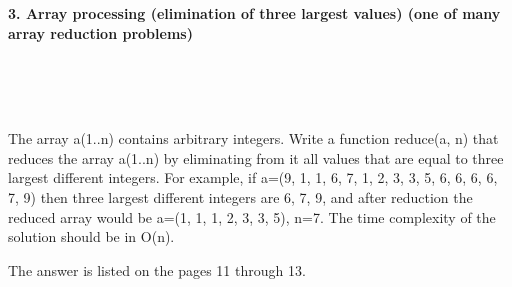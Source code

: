 \documentclass{article}
\begin{document}
\paragraph{}\
\paragraph{}\
\paragraph{}\


	
	\rmfamily
	
	\paragraph{3. Array processing (elimination of three largest values) (one of many array reduction problems) }\
	
	\rmfamily\
	
		The array a(1..n) contains arbitrary integers. Write a function reduce(a, n) that reduces the array a(1..n) by eliminating from it all values that are equal to three largest different integers. For example, if a=(9, 1, 1, 6, 7, 1, 2, 3, 3, 5, 6, 6, 6, 6, 7, 9) then three largest different integers are 6, 7, 9, and after reduction the reduced array would be a=(1, 1, 1, 2, 3, 3, 5), n=7. The time complexity of the solution should be in O(n). 
		\newline
		
		The answer is listed on the pages 11 through 13.
		
	\ttfamily\
	
\paragraph{}\
\paragraph{}\
\paragraph{}\
\paragraph{}\
\paragraph{}\
\paragraph{}\
\end{document}
